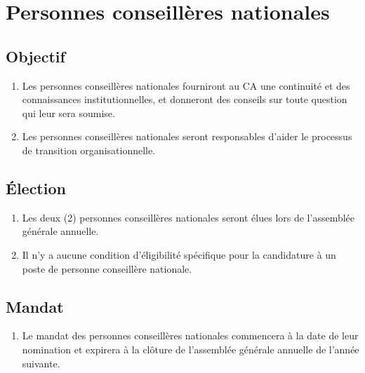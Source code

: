 \section{Personnes conseillères nationales}
\label{personnes-conseilleres-nationales}

\subsection{Objectif}
\label{personnes-conseilleres-nationales-objectif}

\begin{enumerate}
 \item Les personnes conseillères nationales fourniront au CA une continuité et des connaissances institutionnelles, et donneront des conseils sur toute question qui leur sera soumise.
 \item Les personnes conseillères nationales seront responsables d'aider le processus de transition organisationnelle.
\end{enumerate}

\subsection{Élection}
\label{personnes-conseilleres-nationales-election}

\begin{enumerate}
 \item Les deux (2) personnes conseillères nationales seront élues lors de l'assemblée générale annuelle.
 \item Il n'y a aucune condition d'éligibilité spécifique pour la candidature à un poste de personne conseillère nationale.
\end{enumerate}

\subsection{Mandat}
\label{personnes-conseilleres-nationales-mandat}

\begin{enumerate}
 \item Le mandat des personnes conseillères nationales commencera à la date de leur nomination et expirera à la clôture de l'assemblée générale annuelle de l'année suivante.
\end{enumerate}
